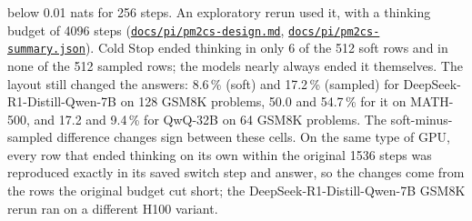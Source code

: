\documentclass[11pt,letterpaper]{article}
\newcommand{\repourl}{https://github.com/tdj28/neural-shrimp}
\newcommand{\reporef}{arxiv-v1}
\newcommand{\repo}[1]{\href{\repourl/blob/\reporef/#1}{\nolinkurl{#1}}}
\begin{document}
below 0.01 nats for 256 steps. An exploratory rerun used it, with a thinking budget of 4096 steps
(\repo{docs/pi/pm2cs-design.md}, \repo{docs/pi/pm2cs-summary.json}). Cold Stop ended thinking in only 6 of the 512
soft rows and in none of the 512 sampled rows; the models nearly always ended it themselves. The layout still changed the answers: 8.6\,\% (soft) and
17.2\,\% (sampled) for DeepSeek-R1-Distill-Qwen-7B on 128 GSM8K problems, 50.0 and 54.7\,\% for it on MATH-500, and
17.2 and 9.4\,\% for QwQ-32B on 64 GSM8K problems. The soft-minus-sampled difference changes sign between these
cells. On the same type of GPU, every row that ended thinking on its own within the original 1536 steps was reproduced
exactly in its saved switch step and answer, so the changes come from the rows the original budget cut short; the DeepSeek-R1-Distill-Qwen-7B GSM8K rerun
ran on a different H100 variant.
\end{document}
